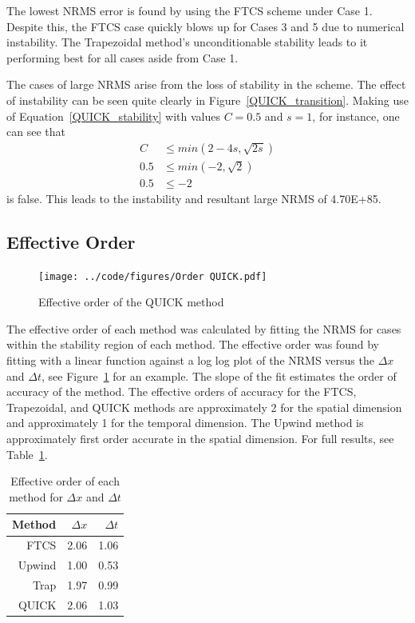 \documentclass[twocolumn,10pt]{asme2ej}
\begin{document}
The lowest NRMS error is found by using the FTCS scheme under Case 1. Despite this, the FTCS case quickly blows up for Cases 3 and 5 due to numerical instability. The Trapezoidal method's unconditionable stability leads to it performing best for all cases aside from Case 1.

The cases of large NRMS arise from the loss of stability in the scheme. The effect of instability can be seen quite clearly in Figure~\ref{QUICK_transition}. Making use of Equation~\ref{QUICK_stability} with values $C=0.5$ and $s=1$, for instance, one can see that
\begin{equation}
\begin{split}
C   & \leq min(2 - 4 s, \sqrt{2s}) \\
0.5 & \leq min(-2, \sqrt 2) \\
0.5 & \leq -2
\end{split}
\end{equation}
is false. This leads to the instability and resultant large NRMS of 4.70E+85.

\subsection{Effective Order}
\begin{figure}[tb]
\begin{center}
\texttt{[image: ../code/figures/Order QUICK.pdf]}
\caption{Effective order of the QUICK method}
\label{QUICK_order}
\end{center}
\end{figure}
The effective order of each method was calculated by fitting the NRMS for cases within the stability region of each method. The effective order was found by fitting with a linear function against a log log plot of the NRMS versus the $\Delta x$ and $\Delta t$, see Figure~\ref{QUICK_order} for an example. The slope of the fit estimates the order of accuracy of the method. The effective orders of accuracy for the FTCS, Trapezoidal, and QUICK methods are approximately 2 for the spatial dimension and approximately 1 for the temporal dimension. The Upwind method is approximately first order accurate in the spatial dimension. For full results, see Table~\ref{effective_order_table}.

\begin{table}[htb]
\begin{center}
\begin{tabular}{|r | r | r |}
\hline
Method & $\Delta x$ & $\Delta t$ \\
\hline
FTCS    & 2.06 & 1.06 \\
Upwind  & 1.00 & 0.53 \\
Trap    & 1.97 & 0.99 \\
QUICK   & 2.06 & 1.03 \\
\hline
\end{tabular}
\caption{Effective order of each method for $\Delta x$ and $\Delta t$}
\label{effective_order_table}
\end{center}
\end{table}
\end{document}
